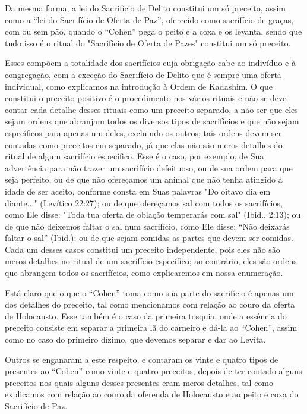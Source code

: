 Da mesma forma, a lei do Sacrifício de Delito constitui um só pre­ceito,
assim como a ``lei do Sacrifício de Oferta de Paz'', oferecido como
sacri­fício de graças, com ou sem pão, quando o ``Cohen'' pega o peito e a
coxa e os levanta, sendo que tudo isso é o ritual do "Sacrifício de
Oferta de Pazes" constitui um só preceito.


Esses compõem a totalidade dos sacrifícios cuja obrigação cabe ao
indivíduo e à congregação, com a exceção do Sacrifício de Delito que é
sempre uma oferta individual, como explicamos na introdução à Ordem de
Kadashim.
O que constitui o preceito positivo é o procedimento nos vários rituais
e não se deve contar cada detalhe desses rituais como um preceito
separado, a não ser que eles sejam ordens que abranjam todos os diversos tipos de
sacrifícios e que não sejam específicos para apenas um deles, excluindo
os outros; tais or­dens devem ser contadas como preceitos em separado,
já que elas não são me­ros detalhes do ritual de algum sacrifício
específico. Esse é o caso, por exem­plo, de Sua advertência para não
trazer um sacrifício defeituoso, ou de sua or­dem para que seja
perfeito, ou de que não ofereçamos um animal que não te­nha atingido a
idade de ser aceito, conforme consta em Suas palavras "Do oita­vo dia em
diante..." (Levítico 22:27); ou de que ofereçamos sal com todos os
sacrifícios, como Ele disse: "Toda tua oferta de oblação temperarás com
sal" (Ibid., 2:13); ou de que não deixemos faltar o sal num sacrifício,
como Ele dis­se: ``Não deixarás faltar o sal'' (Ibid.); ou de que sejam
comidas as partes que devem ser comidas. Cada um desses casos constitui
um preceito independen­te, pois eles não são meros detalhes no ritual de
um sacrifício específico; ao contrário, eles são ordens que abrangem
todos os sacrifícios, como explicare­mos em nossa enumeração.

Está claro que o que o ``Cohen'' toma como sua parte do sacrifício é
apenas um dos detalhes do preceito, tal como mencionamos com relação ao
couro da oferta de Holocausto. Esse também é o caso da primeira tosquia,
on­de a essência do preceito consiste em separar a primeira lã do
carneiro e dá-la ao ``Cohen'', assim como no caso do primeiro dízimo, que
devemos separar e dar ao Levita.

Outros se enganaram a este respeito, e contaram os vinte e quatro tipos
de presentes ao ``Cohen'' como vinte e quatro preceitos, depois de ter
contado alguns preceitos nos quais alguns desses presentes eram meros
deta­lhes, tal como explicamos com relação ao couro da oferenda de
Holocausto e ao peito e coxa do Sacrifício de Paz.

